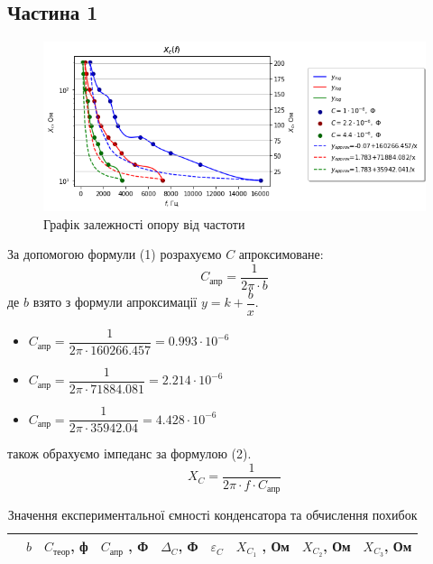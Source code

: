 \documentclass[a4paper,12pt]{article}
\begin{document}
\begin{justify}
    \subsection*{Частина 1}
    \begin{figure}[h!]
		\begin{center}
			\includegraphics[scale=0.8]{media/graph13a}
		\end{center}
		\caption{Графік залежності опору від частоти}
		\label{Picture_1}
	\end{figure}
	За допомогою формули (1) розрахуємо $C$ апроксимоване:
	\begin{equation}
		C_{\textrm{апр}}=\dfrac{1}{2\pi\cdot b}
	\end{equation}
	де $b$ взято з формули апроксимації $y=k+\dfrac{b}{x}$.
	\begin{itemize}
		\item $C_{\textrm{апр}}=\dfrac1{2\pi\cdot 160266.457}=0.993\cdot10^{-6}$
		\item $C_{\textrm{апр}}=\dfrac1{2\pi\cdot 71884.081}=2.214\cdot10^{-6}$
		\item $C_{\textrm{апр}}=\dfrac1{2\pi\cdot 35942.04}=4.428\cdot10^{-6}$
	\end{itemize}
	також обрахуємо імпеданс за формулою (2).
	\begin{equation}
		X_C=\dfrac1{2\pi\cdot f\cdot C_{\textrm{апр}}}
	\end{equation}
	\begin{table}[htp]
	\begin{adjustwidth}{-0.9cm}{}
	\begin{flushright}
		\caption{Значення експериментальної ємності конденсатора та обчислення похибок }
	\end{flushright}
\begin{tabular}{|c|c|c|c|c|c|c|c|c|}
\hline
  & $b$                & $C_{\textrm{теор}}$, ф                              & $C_{\textrm{апр}}$  ,       Ф                         & $\Delta_C$,   Ф                                     & $\varepsilon_C$ & $X_{C_1}$ ,    Ом                                      & $X_{C_2}$,       Ом                                   & $X_{C_3}$,  Ом                                         \\ \hline

\end{tabular}
\end{adjustwidth}
\end{table}
\end{justify}
\end{document}
